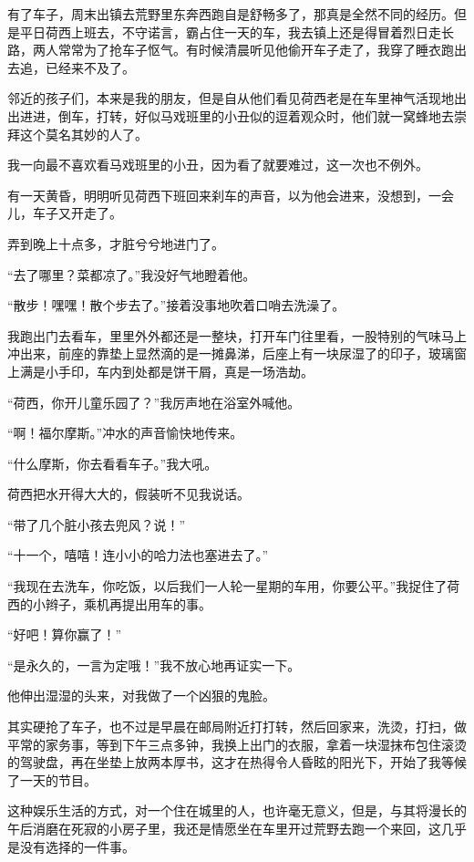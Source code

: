 \par 有了车子，周末出镇去荒野里东奔西跑自是舒畅多了，那真是全然不同的经历。但是平日荷西上班去，不守诺言，霸占住一天的车，我去镇上还是得冒着烈日走长路，两人常常为了抢车子怄气。有时候清晨听见他偷开车子走了，我穿了睡衣跑出去追，已经来不及了。
\par 邻近的孩子们，本来是我的朋友，但是自从他们看见荷西老是在车里神气活现地出出进进，倒车，打转，好似马戏班里的小丑似的逗着观众时，他们就一窝蜂地去崇拜这个莫名其妙的人了。
\par 我一向最不喜欢看马戏班里的小丑，因为看了就要难过，这一次也不例外。
\par 有一天黄昏，明明听见荷西下班回来刹车的声音，以为他会进来，没想到，一会儿，车子又开走了。
\par 弄到晚上十点多，才脏兮兮地进门了。
\par “去了哪里？菜都凉了。”我没好气地瞪着他。
\par “散步！嘿嘿！散个步去了。”接着没事地吹着口哨去洗澡了。
\par 我跑出门去看车，里里外外都还是一整块，打开车门往里看，一股特别的气味马上冲出来，前座的靠垫上显然滴的是一摊鼻涕，后座上有一块尿湿了的印子，玻璃窗上满是小手印，车内到处都是饼干屑，真是一场浩劫。
\par “荷西，你开儿童乐园了？”我厉声地在浴室外喊他。
\par “啊！福尔摩斯。”冲水的声音愉快地传来。
\par “什么摩斯，你去看看车子。”我大吼。
\par 荷西把水开得大大的，假装听不见我说话。
\par “带了几个脏小孩去兜风？说！”
\par “十一个，嘻嘻！连小小的哈力法也塞进去了。”
\par “我现在去洗车，你吃饭，以后我们一人轮一星期的车用，你要公平。”我捉住了荷西的小辫子，乘机再提出用车的事。
\par “好吧！算你赢了！”
\par “是永久的，一言为定哦！”我不放心地再证实一下。
\par 他伸出湿湿的头来，对我做了一个凶狠的鬼脸。
\par 其实硬抢了车子，也不过是早晨在邮局附近打打转，然后回家来，洗烫，打扫，做平常的家务事，等到下午三点多钟，我换上出门的衣服，拿着一块湿抹布包住滚烫的驾驶盘，再在坐垫上放两本厚书，这才在热得令人昏眩的阳光下，开始了我等候了一天的节目。
\par 这种娱乐生活的方式，对一个住在城里的人，也许毫无意义，但是，与其将漫长的午后消磨在死寂的小房子里，我还是情愿坐在车里开过荒野去跑一个来回，这几乎是没有选择的一件事。
